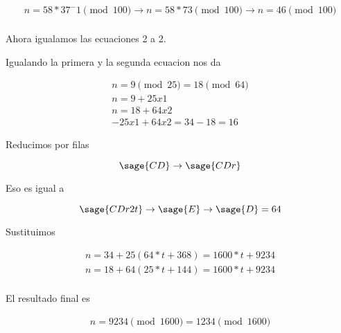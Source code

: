 \documentclass{amsart}
\begin{document}
\begin{align*}
n = 58 * 37^-1 \pmod{100} \to n = 58*73 \pmod{100} \to n = 46 \pmod{100}\\
\end{align*}

Ahora igualamos las ecuaciones 2 a 2.

Igualando la primera y la segunda ecuacion nos da

\begin{align*}
n = 9 \pmod{25} = 18 \pmod{64}\\
n = 9 + 25x1\\
n = 18 + 64x2\\
-25x1 + 64x2 = 34 - 18 = 16
\end{align*}

Reducimos por filas

\[\sage{CD} \to \sage{CDr} \]

Eso es igual a

\[\sage{CDr2t} \to \sage{E} \to \sage{D} = 64\]

Sustituimos

\begin{align*}
n = 34 + 25(64*t + 368) = 1600*t + 9234\\
n = 18 + 64(25*t + 144) = 1600*t + 9234\\
\end{align*}

El resultado final es

\begin{align*}
n = 9234 \pmod{1600} = 1234 \pmod{1600} 
\end{align*}
\end{document}
